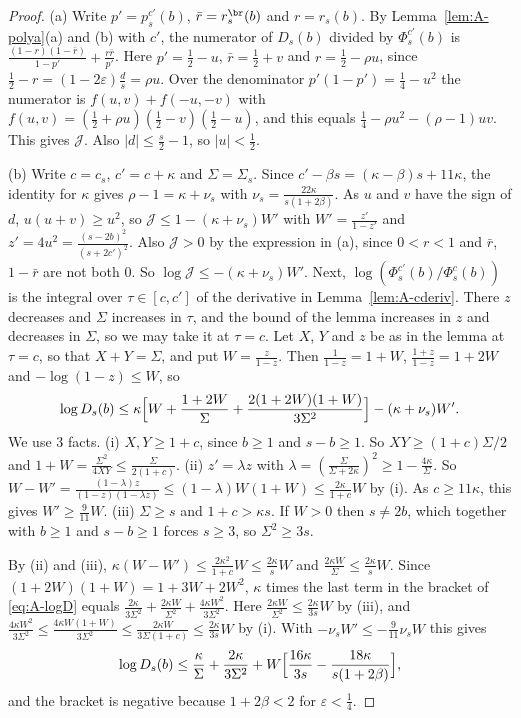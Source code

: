 \begin{proof}
(a) Write $p'=p^{c'}_s(b)$, $\bar r=r^{\br}_s(b)$ and $r=r_s(b)$. By
Lemma~\ref{lem:A-polya}(a) and (b) with $c'$, the numerator of $D_s(b)$
divided by $\Phi^{c'}_s(b)$ is
$\frac{(1-r)(1-\bar r)}{1-p'}+\frac{r\bar r}{p'}$. Here $p'=\frac12-u$,
$\bar r=\frac12+v$ and $r=\frac12-\rho u$, since
$\frac12-r=(1-2\varepsilon)\frac ds=\rho u$. Over the denominator
$p'(1-p')=\frac14-u^2$ the numerator is $f(u,v)+f(-u,-v)$ with
$f(u,v)=(\frac12+\rho u)(\frac12-v)(\frac12-u)$, and this equals
$\frac14-\rho u^2-(\rho-1)uv$. This gives $\mathcal J$. Also
$|d|\le\frac s2-1$, so $|u|<\frac12$.

(b) Write $c=c_s$, $c'=c+\kappa$ and $\Sigma=\Sigma_s$. Since
$c'-\beta s=(\kappa-\beta)s+11\kappa$, the identity for $\kappa$ gives
$\rho-1=\kappa+\nu_s$ with $\nu_s=\frac{22\kappa}{s(1+2\beta)}$. As $u$ and
$v$ have the sign of $d$, $u(u+v)\ge u^2$, so
$\mathcal J\le1-(\kappa+\nu_s)W'$ with $W'=\frac{z'}{1-z'}$ and
$z'=4u^2=\frac{(s-2b)^2}{(s+2c')^2}$. Also $\mathcal J>0$ by the expression
in (a), since $0<r<1$ and $\bar r$, $1-\bar r$ are not both 0. So
$\log\mathcal J\le-(\kappa+\nu_s)W'$. Next,
$\log(\Phi^{c'}_s(b)/\Phi^c_s(b))$ is the integral over $\tau\in[c,c']$ of
the derivative in Lemma~\ref{lem:A-cderiv}. There $z$ decreases and $\Sigma$
increases in $\tau$, and the bound of the lemma increases in $z$ and
decreases in $\Sigma$, so we may take it at $\tau=c$. Let $X$, $Y$ and $z$
be as in the lemma at $\tau=c$, so that $X+Y=\Sigma$, and put
$W=\frac z{1-z}$. Then $\frac1{1-z}=1+W$, $\frac{1+z}{1-z}=1+2W$ and
$-\log(1-z)\le W$, so
\begin{equation}\label{eq:A-logD}
 \log D_s(b)\le\kappa\Bigl[W+\frac{1+2W}\Sigma+\frac{2(1+2W)(1+W)}{3\Sigma^2}\Bigr]
 -(\kappa+\nu_s)W'.
\end{equation}
We use 3 facts. (i) $X,Y\ge1+c$, since $b\ge1$ and $s-b\ge1$. So
$XY\ge(1+c)\Sigma/2$ and $1+W=\frac{\Sigma^2}{4XY}\le\frac\Sigma{2(1+c)}$.
(ii) $z'=\lambda z$ with $\lambda=(\frac\Sigma{\Sigma+2\kappa})^2
\ge1-\frac{4\kappa}\Sigma$. So $W-W'=\frac{(1-\lambda)z}{(1-z)(1-\lambda z)}
\le(1-\lambda)W(1+W)\le\frac{2\kappa}{1+c}W$ by (i). As $c\ge11\kappa$, this
gives $W'\ge\frac9{11}W$. (iii) $\Sigma\ge s$ and $1+c>\kappa s$. If $W>0$
then $s\ne2b$, which together with $b\ge1$ and $s-b\ge1$ forces $s\ge3$, so
$\Sigma^2\ge3s$.

By (ii) and (iii), $\kappa(W-W')\le\frac{2\kappa^2}{1+c}W\le\frac{2\kappa}sW$
and $\frac{2\kappa W}\Sigma\le\frac{2\kappa}sW$. Since
$(1+2W)(1+W)=1+3W+2W^2$, $\kappa$ times the last term in the bracket of
\eqref{eq:A-logD} equals
$\frac{2\kappa}{3\Sigma^2}+\frac{2\kappa W}{\Sigma^2}
+\frac{4\kappa W^2}{3\Sigma^2}$. Here
$\frac{2\kappa W}{\Sigma^2}\le\frac{2\kappa}{3s}W$ by (iii), and
$\frac{4\kappa W^2}{3\Sigma^2}\le\frac{4\kappa W(1+W)}{3\Sigma^2}
\le\frac{2\kappa W}{3\Sigma(1+c)}\le\frac{2\kappa}{3s}W$ by (i). With
$-\nu_sW'\le-\frac9{11}\nu_sW$ this gives
\[
 \log D_s(b)\le\frac\kappa\Sigma+\frac{2\kappa}{3\Sigma^2}
 +W\Bigl[\frac{16\kappa}{3s}-\frac{18\kappa}{s(1+2\beta)}\Bigr],
\]
and the bracket is negative because $1+2\beta<2$ for $\varepsilon<\frac14$.


\end{proof}
